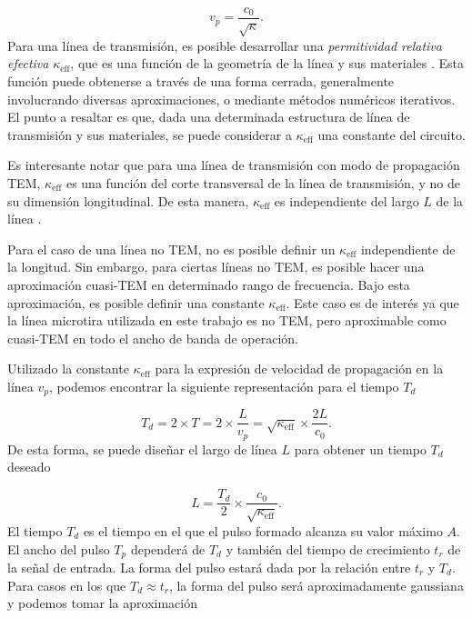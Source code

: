\begin{equation}
  v_p = \frac{c_0}{\sqrt{\kappa}}.
\end{equation}
Para una línea de transmisión, es posible desarrollar una \textit{permitividad
relativa efectiva} $\kappa_{\text{eff}}$, que es una función de la geometría de
la línea y sus materiales \cite{pozar2011}. Esta función puede obtenerse a
través de una forma cerrada, generalmente involucrando diversas aproximaciones,
o mediante métodos numéricos iterativos. El punto a resaltar es que, dada una
determinada estructura de línea de transmisión y sus materiales, se puede
considerar a $\kappa_{\text{eff}}$ una constante del circuito.

Es interesante notar que para una línea de transmisión con modo de propagación
TEM, $\kappa_{\text{eff}}$ es una función del corte transversal de la línea de
transmisión, y no de su dimensión longitudinal. De esta manera,
$\kappa_{\text{eff}}$ es independiente del largo $L$ de la línea
\cite{pozar2011}.

Para el caso de una línea no TEM, no es posible definir un $\kappa_{\text{eff}}$
independiente de la longitud. Sin embargo, para ciertas líneas no TEM, es
posible hacer una aproximación cuasi-TEM en determinado rango de frecuencia.
Bajo esta aproximación, es posible definir una constante $\kappa_{\text{eff}}$.
Este caso es de interés ya que la línea microtira utilizada en este trabajo es
no TEM, pero aproximable como cuasi-TEM en todo el ancho de banda de operación.

Utilizado la constante $\kappa_{\text{eff}}$ para la expresión de velocidad de
propagación en la línea $v_p$, podemos encontrar la siguiente representación
para el tiempo $T_d$

\begin{equation}
    T_d = 2 \times T = 2 \times \frac{L}{v_p} =\sqrt{\kappa_{\text{eff}}}
    \times \frac{2L}{c_0}.
\end{equation}
De esta forma, se puede diseñar el largo de línea $L$ para obtener un tiempo
$T_d$ deseado

\begin{equation}
    \label{eq:stub_length_vs_delay}
    L = \frac{T_d}{2} \times \frac{c_0}{\sqrt{\kappa_{\text{eff}}}}.
\end{equation}
El tiempo $T_d$ es el tiempo en el que el pulso formado alcanza su valor máximo
$A$. El ancho del pulso $T_p$ dependerá de $T_d$ y también del tiempo de
crecimiento $t_r$ de la señal de entrada. La forma del pulso estará dada por la
relación entre $t_r$ y $T_d$. Para casos en los que $T_d \approx t_r$, la forma
del pulso será aproximadamente gaussiana y podemos tomar la aproximación


